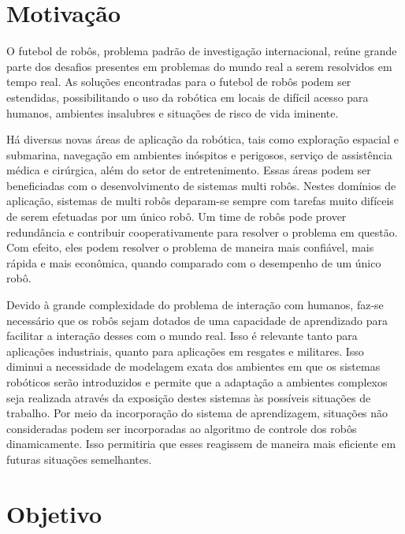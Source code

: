 \section{Motivação}

O futebol de robôs, problema padrão de investigação internacional, reúne grande parte
dos desafios presentes em problemas do mundo real a serem resolvidos em tempo real.
As soluções encontradas para o futebol de robôs podem ser estendidas, possibilitando
o uso da robótica em locais de difícil acesso para humanos, ambientes insalubres e
situações de risco de vida iminente.

Há diversas novas áreas de aplicação da robótica, tais como exploração espacial e submarina,
navegação em ambientes inóspitos e perigosos, serviço de assistência médica
e cirúrgica, além do setor de entretenimento. Essas áreas podem ser beneficiadas com o
desenvolvimento de sistemas
multi robôs. Nestes domínios de aplicação, sistemas de multi robôs deparam-se sempre
com tarefas muito difíceis de serem efetuadas por um único robô. Um time de robôs pode
prover redundância e contribuir cooperativamente para resolver o problema em questão.
Com efeito, eles podem resolver o problema de maneira mais confiável, mais rápida e
mais econômica, quando comparado com o desempenho de um único robô.


Devido à grande complexidade do problema de interação com humanos, faz-se necessário
que os robôs sejam dotados de uma capacidade de aprendizado para facilitar a interação
desses com o mundo real. Isso é relevante tanto para aplicações industriais, quanto para
aplicações em resgates e militares. Isso diminui a necessidade de modelagem
exata dos ambientes em que os sistemas robóticos serão introduzidos e permite que
a adaptação a ambientes complexos seja realizada através da exposição destes sistemas
às possíveis situações de trabalho. Por meio da incorporação do sistema de
aprendizagem, situações não consideradas podem ser incorporadas ao algoritmo de
controle dos robôs dinamicamente. Isso permitiria que esses reagissem de maneira mais
eficiente em futuras situações semelhantes.

\section{Objetivo}

